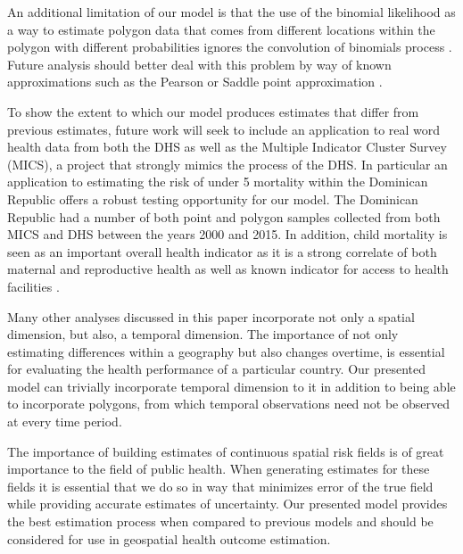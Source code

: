 \documentclass{article}
\begin{document}
An additional limitation of our model is that the use of the binomial likelihood as a way to estimate polygon data that comes from different locations within the polygon with different probabilities ignores the convolution of binomials process \cite{Butler1993}. Future analysis should better deal with this problem by way of known approximations such as the Pearson or Saddle point approximation \cite{Liu2017}.

To show the extent to which our model produces estimates that differ from previous estimates, future work will seek to include an application to real word health data from both the DHS as well as the Multiple Indicator Cluster Survey (MICS), a project that strongly mimics the process of the DHS. In particular an application to estimating the risk of under 5 mortality within the Dominican Republic offers a robust testing opportunity for our model. The Dominican Republic had a number of both point and polygon samples collected from both MICS and DHS between the years 2000 and 2015. In addition, child mortality is seen as an important overall health indicator as it is a strong correlate of both maternal and reproductive health as well as known indicator for access to health facilities \cite{AbouZahr2015}.

Many other analyses discussed in this paper incorporate not only a spatial dimension, but also, a temporal dimension. The importance of not only estimating differences within a geography but also changes overtime, is essential for evaluating the health performance of a particular country. Our presented model can trivially incorporate temporal dimension to it in addition to being able to incorporate polygons, from which temporal observations need not be observed at every time period.

The importance of building estimates of continuous spatial risk fields is of great importance to the field of public health. When generating estimates for these fields it is essential that we do so in way that minimizes error of the true field while providing accurate estimates of uncertainty. Our presented model provides the best estimation process when compared to previous models and should be considered for use in geospatial health outcome estimation.

\newpage



\end{document}

